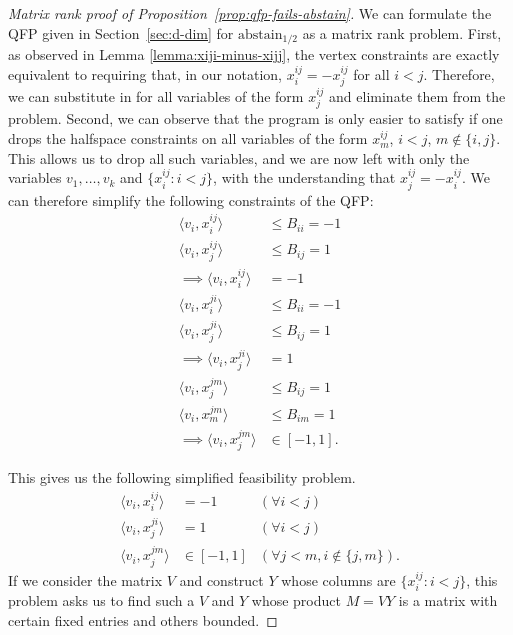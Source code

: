 \documentclass[final]{colt2020} %
\newcommand{\abstain}[1]{\mathrm{abstain}_{#1}}
\newcommand{\inprod}[2]{\langle #1, #2 \rangle}%
\DeclareMathOperator*{\argmax}{arg\,max}
\begin{document}
%
%
\begin{proof}[Matrix rank proof of Proposition~\ref{prop:qfp-fails-abstain}]
	We can formulate the QFP given in Section~\ref{sec:d-dim} for $\abstain{1/2}$ as a matrix rank problem.
	First, as observed in Lemma \ref{lemma:xiji-minus-xijj}, the vertex constraints are exactly equivalent to requiring that, in our notation, $x^{ij}_i = - x^{ij}_j$ for all $i<j$.
	Therefore, we can substitute in for all variables of the form $x^{ij}_j$ and eliminate them from the problem.
	Second, we can observe that the program is only easier to satisfy if one drops the halfspace constraints on all variables of the form $x^{ij}_m$, $i < j$, $m \not\in \{i,j\}$.
	This allows us to drop all such variables, and we are now left with only the variables $v_1,\ldots,v_k$ and $\{x^{ij}_i : i<j\}$, with the understanding that $x^{ij}_j = -x^{ij}_i$.
	We can therefore simplify the following constraints of the QFP:
	\begin{align*}
	\inprod{v_i}{x^{ij}_i} &\leq B_{ii} = -1   \\
	\inprod{v_i}{x^{ij}_j} &\leq B_{ij} = 1  \\
	\implies \inprod{v_i}{x^{ij}_i} &= -1  \\
	\inprod{v_i}{x^{ji}_i} &\leq B_{ii} = -1  \\
	\inprod{v_i}{x^{ji}_j} &\leq B_{ij} = 1  \\
	\implies \inprod{v_i}{x^{ji}_j} &= 1  \\
	\inprod{v_i}{x^{jm}_j} &\leq B_{ij} = 1  \\
	\inprod{v_i}{x^{jm}_m} &\leq B_{im} = 1  \\
	\implies \inprod{v_i}{x^{jm}_j} &\in [-1,1] .
	\end{align*}
	
	This gives us the following simplified feasibility problem.
	\begin{align*}
	\inprod{v_i}{x^{ij}_i} &= -1     & (\forall i<j)  \\
	\inprod{v_i}{x^{ji}_j} &= 1      & (\forall i<j)  \\
	\inprod{v_i}{x^{jm}_j} &\in [-1,1]   & (\forall j<m, i\not\in\{j,m\}) .
	\end{align*}
	If we consider the matrix $V$ and construct $Y$ whose columns are $\{x^{ij}_i : i<j\}$, this problem asks us to find such a $V$ and $Y$ whose product $M = VY$ is a matrix with certain fixed entries and others bounded.
	

\end{proof}
\end{document}
